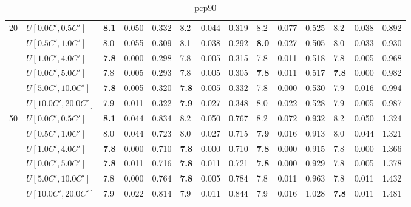 \begin{table}[h]
{\begin{tabular}{|l|l||l|l|l||l|l|l||l|l|l||l|l|l|}
      \hline\hline
      \multirow{6}{*}{20} & $U[0.0C',0.5C']$ & \textbf{8.1} & 0.050 & 0.332 & 8.2 & 0.044 & 0.319 & 8.2 & 0.077 & 0.525 & 8.2 & 0.038 & 0.892 \\
       & $U[0.5C',1.0C']$ & 8.0 & 0.055 & 0.309 & 8.1 & 0.038 & 0.292 & \textbf{8.0} & 0.027 & 0.505 & 8.0 & 0.033 & 0.930 \\
       & $U[1.0C',4.0C']$ & \textbf{7.8} & 0.000 & 0.298 & 7.8 & 0.005 & 0.315 & 7.8 & 0.011 & 0.518 & 7.8 & 0.005 & 0.968 \\
       & $U[0.0C',5.0C']$ & 7.8 & 0.005 & 0.293 & 7.8 & 0.005 & 0.305 & \textbf{7.8} & 0.011 & 0.517 & \textbf{7.8} & 0.000 & 0.982 \\
       & $U[5.0C',10.0C']$ & \textbf{7.8} & 0.005 & 0.320 & \textbf{7.8} & 0.005 & 0.332 & 7.8 & 0.000 & 0.530 & 7.9 & 0.016 & 0.994 \\
       & $U[10.0C',20.0C']$ & 7.9 & 0.011 & 0.322 & \textbf{7.9} & 0.027 & 0.348 & 8.0 & 0.022 & 0.528 & 7.9 & 0.005 & 0.987 \\
      \hline\hline
      \multirow{6}{*}{50} & $U[0.0C',0.5C']$ & \textbf{8.1} & 0.044 & 0.834 & 8.2 & 0.050 & 0.767 & 8.2 & 0.072 & 0.932 & 8.2 & 0.050 & 1.324 \\
       & $U[0.5C',1.0C']$ & 8.0 & 0.044 & 0.723 & 8.0 & 0.027 & 0.715 & \textbf{7.9} & 0.016 & 0.913 & 8.0 & 0.044 & 1.321 \\
       & $U[1.0C',4.0C']$ & \textbf{7.8} & 0.000 & 0.710 & \textbf{7.8} & 0.000 & 0.710 & \textbf{7.8} & 0.000 & 0.915 & 7.8 & 0.000 & 1.366 \\
       & $U[0.0C',5.0C']$ & \textbf{7.8} & 0.011 & 0.716 & \textbf{7.8} & 0.011 & 0.721 & \textbf{7.8} & 0.000 & 0.929 & 7.8 & 0.005 & 1.378 \\
       & $U[5.0C',10.0C']$ & 7.8 & 0.000 & 0.764 & \textbf{7.8} & 0.005 & 0.784 & 7.8 & 0.011 & 0.963 & 7.8 & 0.011 & 1.432 \\
       & $U[10.0C',20.0C']$ & 7.9 & 0.022 & 0.814 & 7.9 & 0.011 & 0.844 & 7.9 & 0.016 & 1.028 & \textbf{7.8} & 0.011 & 1.481 \\
      \hline
      \end{tabular}
      }
      \caption{pcp90}
      \label{tab:pcp90}\end{table}


